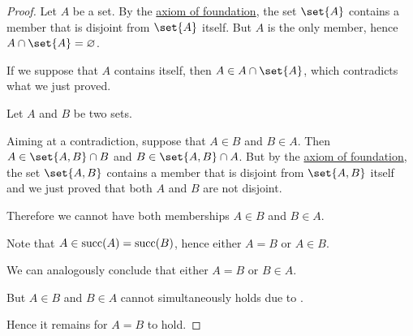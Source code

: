 \begin{proof}
   Let \( A \) be a set. By the \hyperref[def:zfc/foundation]{axiom of foundation}, the set \( \set{ A } \) contains a member that is disjoint from \( \set{ A } \) itself. But \( A \) is the only member, hence \( A \cap \set{ A } = \varnothing \).

  If we suppose that \( A \) contains itself, then \( A \in A \cap \set{ A } \), which contradicts what we just proved.

   Let \( A \) and \( B \) be two sets.

  Aiming at a contradiction, suppose that \( A \in B \) and \( B \in A \). Then \( A \in \set{ A, B } \cap B \) and \( B \in \set{ A, B } \cap A \). But by the \hyperref[def:zfc/foundation]{axiom of foundation}, the set \( \set{ A, B } \) contains a member that is disjoint from \( \set{ A, B } \) itself and we just proved that both \( A \) and \( B \) are not disjoint.

  Therefore we cannot have both memberships \( A \in B \) and \( B \in A \).

   Note that \( A \in \operatorname{succ}(A) = \operatorname{succ}(B) \), hence either \( A = B \) or \( A \in B \).

  We can analogously conclude that either \( A = B \) or \( B \in A \).

  But \( A \in B \) and \( B \in A \) cannot simultaneously holds due to .

  Hence it remains for \( A = B \) to hold.
\end{proof}

